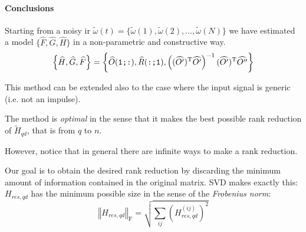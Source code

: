\paragraph{Conclusions} Starting from a noisy \gls{ir} $\widetilde{\omega}(t) = \{\widetilde{\omega}(1), \widetilde{\omega}(2), \ldots, \widetilde{\omega}(N)\}$ we have estimated a model $\{\hat{F}, \hat{G}, \hat{H}\}$ in a non-parametric and constructive way.
\[ \left\{\widehat{H}, \widehat{G}, \widehat{F} \right\} = \left \{\widehat{O}(\texttt{1;:}), \widehat{R}(\texttt{:;1}), \left((\widehat{O'})^{\mathrm{T}}\widehat{O'}\right)^{-1} (\widehat{O'})^{\mathrm{T}}\widehat{O''} \right \}\]

\begin{obs}
    This method can be extended also to the case where the input signal is generic (i.e. not an impulse).
\end{obs}

\begin{remark}
    The method is \emph{optimal} in the sense that it makes the best possible rank reduction of $\tilde{H}_{qd}$, that is from $q$ to $n$.
    
    However, notice that in general there are infinite ways to make a rank reduction.
\end{remark}

\begin{remark}
    Our goal is to obtain the desired rank reduction by discarding the minimum amount of information contained in the original matrix.
    SVD makes exactly this: $H_{res,qd}$ has the minimum possible size in the sense of the \emph{Frobenius norm}:
    \[
        \left\Vert H_{res,qd} \right\Vert_\text{F} = \sqrt{\sum_{ij} \left(H_{res,qd}^{(ij)} \right)^2}
    \]   
\end{remark}

